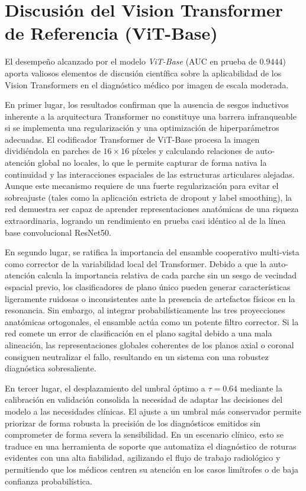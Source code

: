 \section{Discusión del Vision Transformer de Referencia (ViT-Base)}
\label{sec:discusion_vitbase}

El desempeño alcanzado por el modelo \textit{ViT-Base} (AUC en prueba de $0.9444$) aporta valiosos elementos de discusión científica sobre la aplicabilidad de los Vision Transformers en el diagnóstico médico por imagen de escala moderada.

En primer lugar, los resultados confirman que la ausencia de sesgos inductivos inherente a la arquitectura Transformer no constituye una barrera infranqueable si se implementa una regularización y una optimización de hiperparámetros adecuadas. El codificador Transformer de ViT-Base procesa la imagen dividiéndola en parches de $16\times16$ píxeles y calculando relaciones de auto-atención global no locales, lo que le permite capturar de forma nativa la continuidad y las interacciones espaciales de las estructuras articulares alejadas. Aunque este mecanismo requiere de una fuerte regularización para evitar el sobreajuste (tales como la aplicación estricta de dropout y label smoothing), la red demuestra ser capaz de aprender representaciones anatómicas de una riqueza extraordinaria, logrando un rendimiento en prueba casi idéntico al de la línea base convolucional ResNet50.

En segundo lugar, se ratifica la importancia del ensamble cooperativo multi-vista como corrector de la variabilidad local del Transformer. Debido a que la auto-atención calcula la importancia relativa de cada parche sin un sesgo de vecindad espacial previo, los clasificadores de plano único pueden generar características ligeramente ruidosas o inconsistentes ante la presencia de artefactos físicos en la resonancia. Sin embargo, al integrar probabilísticamente las tres proyecciones anatómicas ortogonales, el ensamble actúa como un potente filtro corrector. Si la red comete un error de clasificación en el plano sagital debido a una mala alineación, las representaciones globales coherentes de los planos axial o coronal consiguen neutralizar el fallo, resultando en un sistema con una robustez diagnóstica sobresaliente.

En tercer lugar, el desplazamiento del umbral óptimo a $\tau = 0.64$ mediante la calibración en validación consolida la necesidad de adaptar las decisiones del modelo a las necesidades clínicas. El ajuste a un umbral más conservador permite priorizar de forma robusta la precisión de los diagnósticos emitidos sin comprometer de forma severa la sensibilidad. En un escenario clínico, esto se traduce en una herramienta de soporte que automatiza el diagnóstico de roturas evidentes con una alta fiabilidad, agilizando el flujo de trabajo radiológico y permitiendo que los médicos centren su atención en los casos limítrofes o de baja confianza probabilística.

